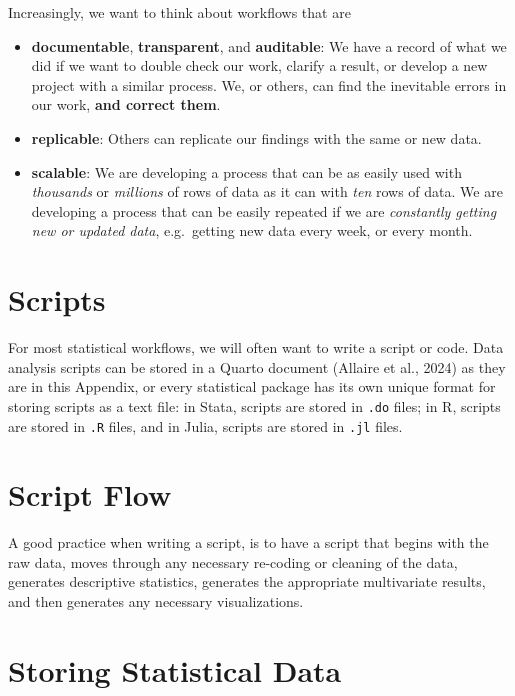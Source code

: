 \documentclass[
  letterpaper,
  DIV=11,
  numbers=noendperiod]{scrreprt}
\providecommand{\tightlist}{%
  \setlength{\itemsep}{0pt}\setlength{\parskip}{0pt}}\usepackage{longtable,booktabs,array}
\begin{document}
Increasingly, we want to think about workflows that are

\begin{itemize}
\tightlist
\item
  \textbf{documentable}, \textbf{transparent}, and \textbf{auditable}:
  We have a record of what we did if we want to double check our work,
  clarify a result, or develop a new project with a similar process. We,
  or others, can find the inevitable errors in our work, \textbf{and
  correct them}.
\item
  \textbf{replicable}: Others can replicate our findings with the same
  or new data.
\item
  \textbf{scalable}: We are developing a process that can be as easily
  used with \emph{thousands} or \emph{millions} of rows of data as it
  can with \emph{ten} rows of data. We are developing a process that can
  be easily repeated if we are \emph{constantly getting new or updated
  data}, e.g.~getting new data every week, or every month.
\end{itemize}

\section{Scripts}\label{scripts}

For most statistical workflows, we will often want to write a script or
code. Data analysis scripts can be stored in a Quarto document (Allaire
et al., 2024) as they are in this Appendix, or every statistical package
has its own unique format for storing scripts as a text file: in Stata,
scripts are stored in \texttt{.do} files; in R, scripts are stored in
\texttt{.R} files, and in Julia, scripts are stored in \texttt{.jl}
files.

\section{Script Flow}\label{script-flow}

A good practice when writing a script, is to have a script that begins
with the raw data, moves through any necessary re-coding or cleaning of
the data, generates descriptive statistics, generates the appropriate
multivariate results, and then generates any necessary visualizations.

\section{Storing Statistical Data}\label{storing-statistical-data}
\end{document}
